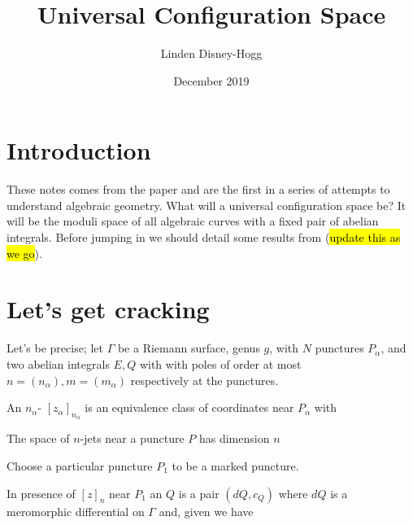 \documentclass{article}
\title{Universal Configuration Space}
\author{Linden Disney-Hogg}
\date{December 2019}
\begin{document}
\maketitle
\tableofcontents

\section{Introduction}
These notes comes from the paper \cite{Krichever1996OnTheories} and are the first in a series of attempts to understand algebraic geometry. What will a universal configuration space be? It will be the moduli space of all algebraic curves with a fixed pair of abelian integrals. Before jumping in we should detail some results from \cite{Miranda1995AlgebraicSurfaces} (\hl{update this as we go}). 

\section{Let's get cracking}
Let's be precise; let $\Gamma$ be a Riemann surface, genus $g$, with $N$ punctures $P_\alpha$, and two abelian integrals $E,Q$ with with poles of order at most $n=(n_\alpha), m=(m_\alpha)$ respectively at the punctures. 

\begin{definition}
An $n_\alpha$- $[z_\alpha]_{n_\alpha}$ is an equivalence class of coordinates near $P_\alpha$ with 
\end{definition}

\begin{fact}
The space of $n$-jets near a puncture $P$ has dimension $n$
\end{fact}

Choose a particular puncture $P_1$ to be a marked puncture. 

\begin{definition}
In presence of $[z]_n$ near $P_1$ an  $Q$ is a pair $(dQ,c_Q)$ where $dQ$ is a meromorphic differential on $\Gamma$ and, given 
we have 
\end{definition}
\end{document}
